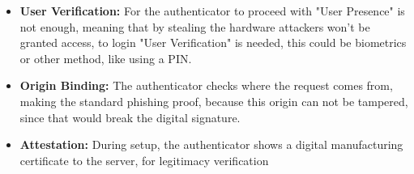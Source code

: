 \begin{itemize}
    \item \textbf{User Verification:} For the authenticator to proceed with "User Presence" is not enough, meaning that by stealing the hardware attackers won't be granted access, to login "User Verification" is needed, this could be biometrics or other method, like using a PIN.
    
    \item \textbf{Origin Binding:} The authenticator checks where the request comes from, making the standard phishing proof, because this origin can not be tampered, since that would break the digital signature.
    
    \item \textbf{Attestation:} During setup, the authenticator shows a digital manufacturing certificate to the server, for legitimacy verification
\end{itemize}